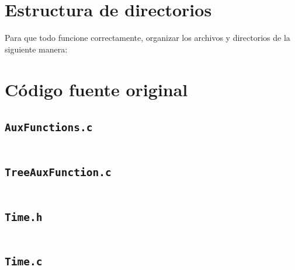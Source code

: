 \documentclass[12pt, fleqn]{report}                             %
\theoremstyle{break}                                            %
\begin{document}
	\begin{appendices}
	
	    \section{Estructura de directorios}
	        Para que todo funcione correctamente, organizar los archivos y directorios de la siguiente manera:
	        
            
        \section{Código fuente original}
        
            \subsection{\texttt{AuxFunctions.c}}
                \inputminted[breaklines, linenos, tabsize=4, fontsize=\footnotesize]{c}{code/AuxFunctions.c}
                
            \subsection{\texttt{TreeAuxFunction.c}}
                \inputminted[breaklines, linenos, tabsize=4, fontsize=\footnotesize]{c}{code/TreeAuxFunction.c}
                
            \subsection{\texttt{Time.h}}
                \inputminted[breaklines, linenos, tabsize=4, fontsize=\footnotesize, lastline=23]{c}{code/Time.h}
                
            \subsection{\texttt{Time.c}}
                \inputminted[breaklines, linenos, tabsize=4, fontsize=\footnotesize]{c}{code/Time.c}
                

\end{appendices}
\end{document}
